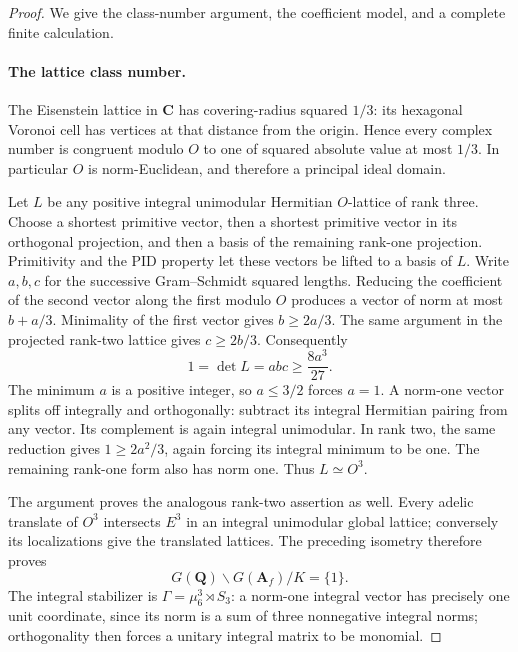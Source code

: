 \documentclass[11pt,a4paper]{article}
\theoremstyle{definition}
\begin{document}
\begin{proof}
We give the class-number argument, the coefficient model, and a
complete finite calculation.

\paragraph{The lattice class number.}
The Eisenstein lattice in $\mathbf C$ has covering-radius squared
$1/3$: its hexagonal Voronoi cell has vertices at that distance from
the origin.  Hence every complex number is congruent modulo $O$ to
one of squared absolute value at most $1/3$.  In particular $O$ is
norm-Euclidean, and therefore a principal ideal domain.

Let $L$ be any positive integral unimodular Hermitian $O$-lattice of
rank three.  Choose a shortest primitive vector, then a shortest
primitive vector in its orthogonal projection, and then a basis of the
remaining rank-one projection.  Primitivity and the PID property let
these vectors be lifted to a basis of $L$.  Write $a,b,c$ for the
successive Gram--Schmidt squared lengths.  Reducing the coefficient
of the second vector along the first modulo $O$ produces a vector of
norm at most $b+a/3$.  Minimality of the first vector gives
$b\geq 2a/3$.  The same argument in the projected rank-two lattice
gives $c\geq 2b/3$.  Consequently
\[
 1=\det L=abc\geq \frac{8a^3}{27}.
 \tag{UH.2}
\]
The minimum $a$ is a positive integer, so $a\leq3/2$ forces $a=1$.
A norm-one vector splits off integrally and orthogonally: subtract
its integral Hermitian pairing from any vector.  Its complement is
again integral unimodular.  In rank two, the same reduction gives
$1\geq2a^2/3$, again forcing its integral minimum to be one.  The
remaining rank-one form also has norm one.  Thus $L\simeq O^3$.

The argument proves the analogous rank-two assertion as well.  Every
adelic translate of $O^3$ intersects $E^3$ in an integral unimodular
global lattice; conversely its localizations give the translated
lattices.  The preceding isometry therefore proves
\[
 G(\mathbf Q)\backslash G(\mathbf A_f)/K=\{1\}.
 \tag{UH.3}
\]
The integral stabilizer is
$\Gamma=\mu_6^3\rtimes S_3$: a norm-one integral vector has precisely
one unit coordinate, since its norm is a sum of three nonnegative
integral norms; orthogonality then forces a unitary integral matrix
to be monomial.


\end{proof}
\end{document}
